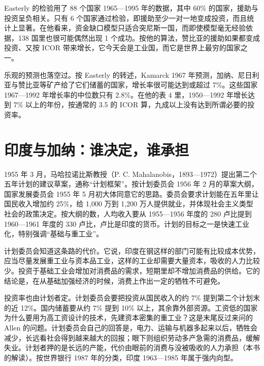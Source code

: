 Easterly 的检验用了 88 个国家 1965—1995 年的数据，其中 60\% 的国家，援助与投资呈负相关\cite{easterly1997}。只有 6 个国家通过检验，即援助至少一对一地变成投资，而且统计上显著\cite{easterly1997}。在他看来，资金缺口模型只适合突尼斯一国，而即使模型毫无经验依据，138 国里也很可能偶然出现 1 个成功\cite{easterly1997}。按他的算法，赞比亚的援助如果都变成投资、又按 ICOR 带来增长，它今天会是工业国，而它是世界上最穷的国家之一\cite{easterly1997}。

乐观的预测也落空过。按 Easterly 的转述，Kamarck 1967 年预测，加纳、尼日利亚与赞比亚等矿产给了它们储蓄的国家，增长率很可能达到或超过 7\%\cite{easterly1997}。这些国家 1967—1992 年增长率的中位数只有 2.8\%\cite{easterly1997}。在他的表 4 里，1950—1992 年增长达到 7\% 以上的年份，按通常的 3.5 的 ICOR 算，九成以上没有达到所谓必要的投资率\cite{easterly1997}。

\section{印度与加纳：谁决定，谁承担}\label{sec:development-cases}

1955 年 3 月，马哈拉诺比斯教授（P. C. Mahalanobis，1893—1972）提出第二个五年计划的建议草案，通称“计划框架”\cite{india1956,loc41,gnd41}。按计划委员会 1956 年 2 月的草案大纲，国家发展委员会 1955 年 5 月初大体同意它的思路\cite{india1956}。委员会要求计划能在五年里让国民收入增加约 25\%，给 1,000 万到 1,200 万人提供就业，并体现社会主义类型社会的政策决定\cite{india1956}。按大纲的数，人均收入要从 1955—1956 年度的 280 卢比提到 1960—1961 年度的 330 卢比，卢比是印度的货币\cite{india1956}。计划的目标之一是快速工业化，特别强调“基础与重工业”\cite{india1956}。

计划委员会知道这条路的代价\cite{india1956}。它说，印度在钢这样的部门可能有比较成本优势，应当尽量发展重工业与资本品工业，这样的工业却需要大量资本，吸收的人力比较少\cite{india1956}。投资于基础工业会增加对消费品的需求，短期里却不增加消费品的供给。它的结论是，在从基础加强经济的时候，消费上作出一定的牺牲不可避免\cite{india1956}。

投资率也由计划者定。计划委员会要把投资从国民收入的约 7\% 提到第二个计划末的近 12\%\cite{india1956}。国内储蓄要从约 7\% 提到 10\% 以上，其余靠外部资源\cite{india1956}。工资低的国家为什么要用为高工资设计的技术，先建资本密集的重工业？这是末尾反过来问的 Allen 的问题。计划委员会自己的回答是，电力、运输与机器多起来以后，牺牲会减少，长远看社会得到越来越大的回报；眼下则组织劳动多产急需的消费品，缓解失业\cite{india1956}。计划者押的是长远的产能，代价由眼前的消费与没被吸收的人力承担（本书的解读）。按世界银行 1987 年的分类，印度 1963—1985 年属于强内向型\cite{wdr1987}。

